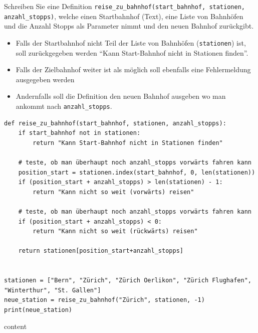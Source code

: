 \begin{questions}
Schreiben Sie eine Definition \lstinline|reise_zu_bahnhof(start_bahnhof, stationen, anzahl_stopps)|, welche einen Startbahnhof (Text), eine Liste von Bahnhöfen und die Anzahl Stopps als Parameter nimmt und den neuen Bahnhof zurückgibt.
\begin{itemize}
\item Falls der Startbahnhof nicht Teil der Liste von Bahnhöfen (\lstinline|stationen|) ist, soll zurückgegeben werden \enquote{Kann Start-Bahnhof nicht in Stationen finden}.
\item Falls der Zielbahnhof weiter ist als möglich soll ebenfalls eine Fehlermeldung ausgegeben werden
\item Andernfalls soll die Definition den neuen Bahnhof ausgeben wo man ankommt nach \lstinline|anzahl_stopps|.
\end{itemize}
\begin{solution}
\begin{lstlisting}
def reise_zu_bahnhof(start_bahnhof, stationen, anzahl_stopps):
    if start_bahnhof not in stationen:
        return "Kann Start-Bahnhof nicht in Stationen finden"

    # teste, ob man überhaupt noch anzahl_stopps vorwärts fahren kann
    position_start = stationen.index(start_bahnhof, 0, len(stationen))
    if (position_start + anzahl_stopps) > len(stationen) - 1:
        return "Kann nicht so weit (vorwärts) reisen"

    # teste, ob man überhaupt noch anzahl_stopps vorwärts fahren kann
    if (position_start + anzahl_stopps) < 0:
        return "Kann nicht so weit (rückwärts) reisen"

    return stationen[position_start+anzahl_stopps]


stationen = ["Bern", "Zürich", "Zürich Oerlikon", "Zürich Flughafen", "Winterthur", "St. Gallen"]
neue_station = reise_zu_bahnhof("Zürich", stationen, -1)
print(neue_station)
\end{lstlisting}
content
\end{solution}

\end{questions}
